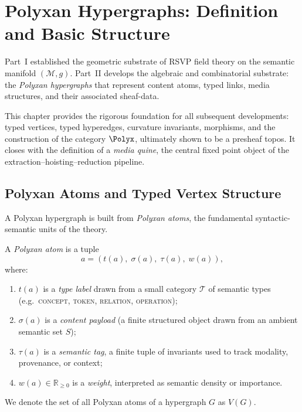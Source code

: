 \chapter{Polyxan Hypergraphs: Definition and Basic Structure}
\label{ch:polyxan-basic}

Part~I established the geometric substrate of RSVP field theory on the semantic
manifold $(\mathcal{M},g)$.  
Part~II develops the algebraic and combinatorial substrate: the
\emph{Polyxan hypergraphs} that represent content atoms, typed links, media
structures, and their associated sheaf-data.

This chapter provides the rigorous foundation for all subsequent developments:
typed vertices, typed hyperedges, curvature invariants, morphisms, and the
construction of the category $\Polyx$, ultimately shown to be a presheaf topos.
It closes with the definition of a \emph{media quine}, the central fixed point
object of the extraction--hoisting--reduction pipeline.

\section{Polyxan Atoms and Typed Vertex Structure}

A Polyxan hypergraph is built from \emph{Polyxan atoms}, the fundamental
syntactic-semantic units of the theory.

\begin{definition}
A \emph{Polyxan atom} is a tuple
\[
a = (t(a),\;\sigma(a),\;\tau(a),\;w(a)),
\]
where:
\begin{enumerate}
  \item $t(a)$ is a \emph{type label} drawn from a small category $\mathcal{T}$
        of semantic types (e.g.\ \textsc{concept}, \textsc{token},
        \textsc{relation}, \textsc{operation});
  \item $\sigma(a)$ is a \emph{content payload} (a finite structured object
        drawn from an ambient semantic set $S$);
  \item $\tau(a)$ is a \emph{semantic tag}, a finite tuple of invariants used to
        track modality, provenance, or context;
  \item $w(a)\in\mathbb{R}_{\ge 0}$ is a \emph{weight}, interpreted as
        semantic density or importance.
\end{enumerate}
We denote the set of all Polyxan atoms of a hypergraph $G$ as $V(G)$.
\end{definition}

